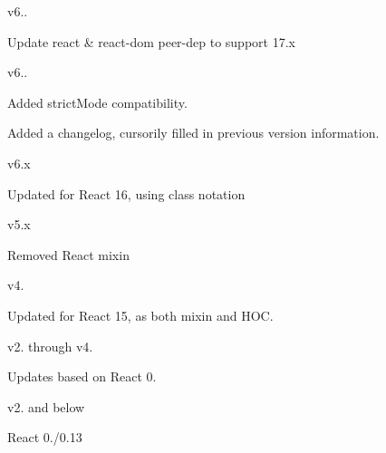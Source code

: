 v6..


\begin{DoxyItemize}
\item Update react \& react-\/dom peer-\/dep to support 17.\+x
\end{DoxyItemize}

v6..


\begin{DoxyItemize}
\item Added strict\+Mode compatibility.
\item Added a changelog, cursorily filled in previous version information.
\end{DoxyItemize}

v6.\+x

Updated for React 16, using {\ttfamily class} notation

v5.\+x

Removed React mixin

v4.

Updated for React 15, as both mixin and HOC.

v2. through v4.

Updates based on React 0.

v2. and below

React 0./0.13 